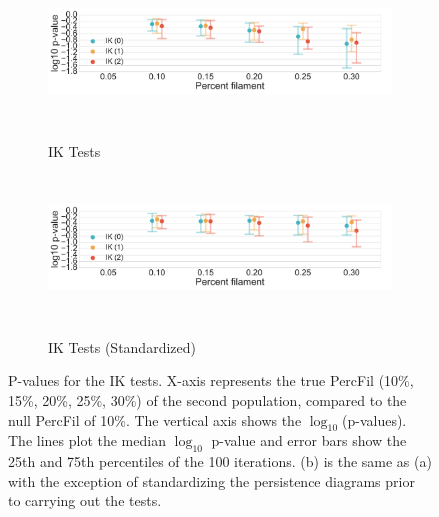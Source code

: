 \documentclass[12pt]{article}
\begin{document}
\begin{figure}[htp!]
  \centering
  \begin{subfigure}{.9\textwidth}
    \centering
    \caption{IK Tests}
    \includegraphics[width=\linewidth, height = 1.5in]{figure_8_contour_group.pdf}
    \label{fig:sub_contour}
  \end{subfigure}
  \begin{subfigure}{.9\textwidth}
    \centering
    \caption{IK Tests (Standardized)}
    \includegraphics[width=\linewidth, height = 1.5in]{figure_8_contour_group_normed.pdf}
    \label{fig:sub_contour_normed}
  \end{subfigure}
\label{fig:sub_contour_results}
\caption{P-values for the IK tests. X-axis represents the true PercFil (10\%, 15\%, 20\%, 25\%, 30\%) of the second population, compared to the null PercFil of 10\%.
The vertical axis shows the $\log_{10}$(p-values). The lines plot the median $\log_{10}$ p-value and error bars show the 25th and 75th percentiles of the 100 iterations. (b) is the same as (a) with the exception of standardizing the persistence diagrams prior to carrying out the tests. }
\end{figure}
\end{document}
